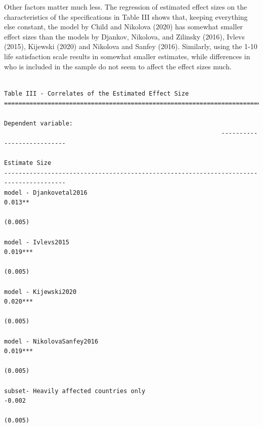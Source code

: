 \documentclass[
  letterpaper,
  DIV=11,
  numbers=noendperiod]{scrartcl}
\begin{document}
Other factors matter much less. The regression of estimated effect sizes
on the characteristics of the specifications in Table III shows that,
keeping everything else constant, the model by Child and Nikolova (2020)
has somewhat smaller effect sizes than the models by Djankov, Nikolova,
and Zilinsky (2016), Ivlevs (2015), Kijewski (2020) and Nikolova and
Sanfey (2016). Similarly, using the 1-10 life satisfaction scale results
in somewhat smaller estimates, while differences in who is included in
the sample do not seem to affect the effect sizes much.

\begin{verbatim}

Table III - Correlates of the Estimated Effect Size
=======================================================================================
                                                                Dependent variable:    
                                                            ---------------------------
                                                                   Estimate Size       
---------------------------------------------------------------------------------------
model - Djankovetal2016                                               0.013**          
                                                                      (0.005)          
                                                                                       
model - Ivlevs2015                                                   0.019***          
                                                                      (0.005)          
                                                                                       
model - Kijewski2020                                                 0.020***          
                                                                      (0.005)          
                                                                                       
model - NikolovaSanfey2016                                           0.019***          
                                                                      (0.005)          
                                                                                       
subset- Heavily affected countries only                               -0.002           
                                                                      (0.005)          
                                                                                       

\end{verbatim}
\end{document}
